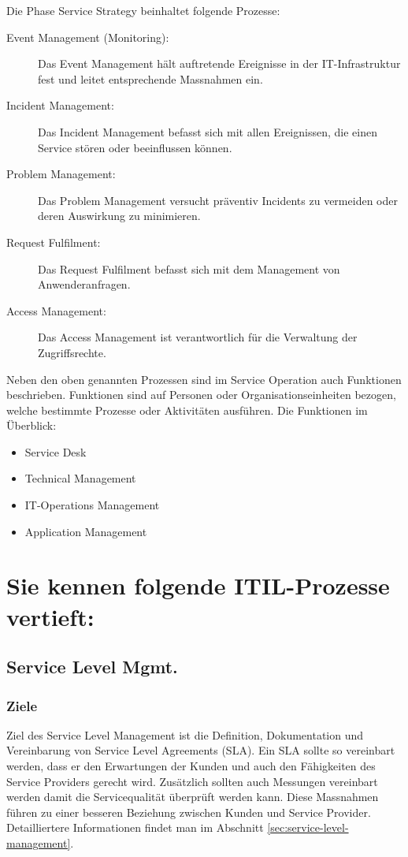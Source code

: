 Die Phase Service Strategy beinhaltet folgende Prozesse:
\begin{description}
	\item[Event Management (Monitoring):] Das Event Management hält auftretende Ereignisse in der IT-Infrastruktur fest und leitet entsprechende Massnahmen ein.
	\item[Incident Management:] Das Incident Management befasst sich mit allen Ereignissen, die einen Service stören oder beeinflussen können.
	\item[Problem Management:] Das Problem Management versucht präventiv Incidents zu vermeiden oder deren Auswirkung zu minimieren.
	\item[Request Fulfilment:] Das Request Fulfilment befasst sich mit dem Management von Anwenderanfragen.
	\item[Access Management:] Das Access Management ist verantwortlich für die Verwaltung der Zugriffsrechte.
\end{description}
Neben den oben genannten Prozessen sind im Service Operation auch Funktionen beschrieben. Funktionen sind auf Personen oder Organisationseinheiten bezogen, welche bestimmte Prozesse oder Aktivitäten ausführen. Die Funktionen im Überblick:
\begin{itemize}
	\item Service Desk
	\item Technical Management
    \item IT-Operations Management
	\item Application Management
\end{itemize}

\section{Sie kennen folgende ITIL-Prozesse vertieft:} 

\subsection{Service Level Mgmt.}

\subsubsection{Ziele}

Ziel des Service Level Management ist die Definition, Dokumentation und Vereinbarung von Service Level Agreements (SLA). Ein SLA sollte so vereinbart werden, dass er den Erwartungen der Kunden und auch den Fähigkeiten des Service Providers gerecht wird. Zusätzlich sollten auch Messungen vereinbart werden damit die Servicequalität überprüft werden kann. Diese Massnahmen führen zu einer besseren Beziehung zwischen Kunden und Service Provider. Detailliertere Informationen findet man im Abschnitt \ref{sec:service-level-management}.

